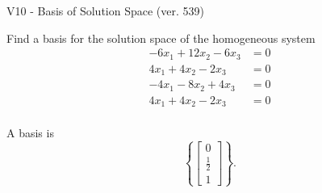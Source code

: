 \begin{exercise}
  \begin{exerciseTitle}V10 - Basis of Solution Space (ver. 539)\end{exerciseTitle}
  \begin{exerciseStatement}
    Find a basis for the solution space of the homogeneous system 
\begin{align*}
 -6 x_ 1 + 12 x_ 2 -6 x_ 3 &= 0  \\ 
  4 x_ 1 + 4 x_ 2 -2 x_ 3 &= 0  \\ 
  -4 x_ 1 -8 x_ 2 + 4 x_ 3 &= 0  \\ 
  4 x_ 1 + 4 x_ 2 -2 x_ 3 &= 0  \\ 
 \end{align*}


 
  \end{exerciseStatement}

  \begin{exerciseAnswer}
   A basis is   
\[\left\{\left[\begin{array}{c}
0 \\
\frac{1}{2} \\
1
\end{array}\right]\right\}.\]

  


  \end{exerciseAnswer}
\end{exercise}